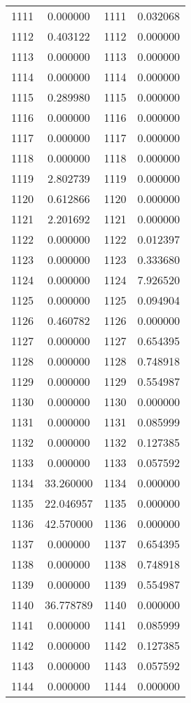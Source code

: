 \documentclass[12pt]{article}
\begin{document}
\begin{longtable}{@{}cccc@{}}
1111 & 0.000000 & 1111 & 0.032068 \\
1112 & 0.403122 & 1112 & 0.000000 \\
1113 & 0.000000 & 1113 & 0.000000 \\
1114 & 0.000000 & 1114 & 0.000000 \\
1115 & 0.289980 & 1115 & 0.000000 \\
1116 & 0.000000 & 1116 & 0.000000 \\
1117 & 0.000000 & 1117 & 0.000000 \\
1118 & 0.000000 & 1118 & 0.000000 \\
1119 & 2.802739 & 1119 & 0.000000 \\
1120 & 0.612866 & 1120 & 0.000000 \\
1121 & 2.201692 & 1121 & 0.000000 \\
1122 & 0.000000 & 1122 & 0.012397 \\
1123 & 0.000000 & 1123 & 0.333680 \\
1124 & 0.000000 & 1124 & 7.926520 \\
1125 & 0.000000 & 1125 & 0.094904 \\
1126 & 0.460782 & 1126 & 0.000000 \\
1127 & 0.000000 & 1127 & 0.654395 \\
1128 & 0.000000 & 1128 & 0.748918 \\
1129 & 0.000000 & 1129 & 0.554987 \\
1130 & 0.000000 & 1130 & 0.000000 \\
1131 & 0.000000 & 1131 & 0.085999 \\
1132 & 0.000000 & 1132 & 0.127385 \\
1133 & 0.000000 & 1133 & 0.057592 \\
1134 & 33.260000 & 1134 & 0.000000 \\
1135 & 22.046957 & 1135 & 0.000000 \\
1136 & 42.570000 & 1136 & 0.000000 \\
1137 & 0.000000 & 1137 & 0.654395 \\
1138 & 0.000000 & 1138 & 0.748918 \\
1139 & 0.000000 & 1139 & 0.554987 \\
1140 & 36.778789 & 1140 & 0.000000 \\
1141 & 0.000000 & 1141 & 0.085999 \\
1142 & 0.000000 & 1142 & 0.127385 \\
1143 & 0.000000 & 1143 & 0.057592 \\
1144 & 0.000000 & 1144 & 0.000000 \\

\end{longtable}
\end{document}
